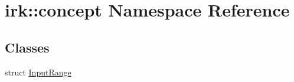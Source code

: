 \hypertarget{namespaceirk_1_1concept}{}\section{irk\+:\+:concept Namespace Reference}
\label{namespaceirk_1_1concept}
\subsection*{Classes}
\begin{DoxyCompactItemize}
\item 
struct \mbox{\hyperlink{structirk_1_1concept_1_1InputRange}{Input\+Range}}
\end{DoxyCompactItemize}
